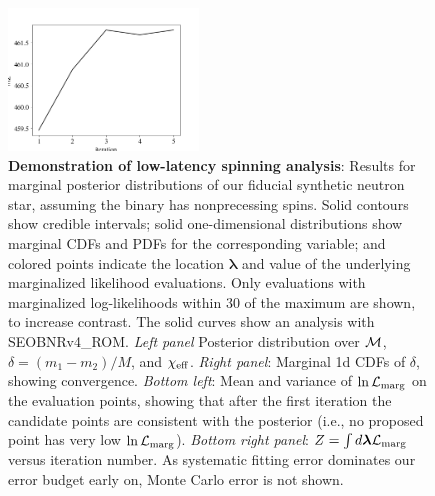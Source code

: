 \documentclass[twocolumn,prd,nofootinbib]{revtex4}
\newcommand\editremark[1]{{\color{red} #1}}
\newcommand{\mc}{{\cal M}}
\begin{document}
\begin{figure}
\includegraphics[width=0.45\textwidth]{figures/bns_withspin_lnL_converge.png}
\caption{\label{fig:BNS:Spin}\textbf{Demonstration of low-latency spinning analysis}:
Results for marginal posterior distributions
  of our fiducial synthetic neutron star, assuming the binary has nonprecessing spins.  Solid contours show credible intervals; solid one-dimensional distributions
  show marginal CDFs and PDFs for the corresponding variable; and colored points indicate the location $\bm{\lambda}$ and
  value of the underlying marginalized likelihood evaluations.  Only evaluations with marginalized log-likelihoods within $30$ of the maximum are shown, to increase contrast. The solid curves show an analysis with SEOBNRv4\_ROM.
 \emph{Left panel } Posterior distribution
  over  $\mc$,
  $\delta=(m_1-m_2)/M$, and $\chi_{\rm eff}$.    \emph{Right panel}: Marginal 1d CDFs of $\delta$, showing convergence.
\emph{Bottom left}: Mean and variance of  $\ln{\cal L}_{\rm marg}$ on the evaluation points,  showing that after the
first iteration the
candidate points are consistent with the posterior (i.e., no proposed point has very low $\ln {\cal L}_{\rm marg}$).
\emph{Bottom right panel}: $Z = \int d\bm{\lambda} {\cal L}_{\rm marg}$ versus iteration number.  As systematic fitting error dominates our
error budget early on, Monte Carlo error is not shown.
}
\end{figure}
\end{document}
